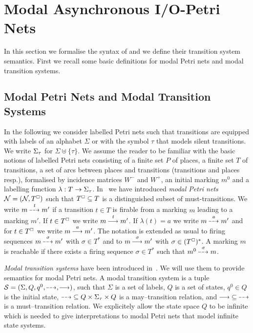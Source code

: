 
\section{Modal Asynchronous I/O-Petri Nets}\label{sec:maiots}

In this section we formalise the syntax of \MAIOPNs and we define their transition system semantics. 
First we recall some basic definitions for modal Petri nets and modal transition systems.

\subsection{Modal Petri Nets and Modal Transition Systems}\label{subsec:basics-modal}

In the following we consider labelled Petri nets such that transitions are equipped
with labels of an alphabet $\Sigma$ or with the symbol $\tau$ that models silent transitions.
We write $\Sigma_\tau$ for $\Sigma \uplus \{\tau\}$.
We assume the reader to be familiar with the basic notions of labelled Petri nets consisting of a finite set
$P$ of places, a finite set $T$ of transitions, a set of arcs between places and transitions (transitions and places resp.),
formalised by incidence matrices $W^-$ and $W^+$,
an initial marking $m^0$ and a labelling function $\lambda : T \rightarrow \Sigma_\tau$. 
In~\cite{EHH12} we have introduced \emph{modal Petri nets}
$\mathcal{N} = (\mathcal{N}_{},T_{}^{\scriptscriptstyle\square})$ such that $T^{\scriptscriptstyle\square} \subseteq T$  is a distinguished subset  of must-transitions.
We write $m \may{t} m'$ if a transition $t \in T$ is firable from a marking $m$ leading to a marking $m'$.
If $t \in T^{\scriptscriptstyle\square}$ we write $m \must{t} m'$. 
If $\lambda (t) = a$ we write $m \may{a} m'$ and for $t \in T^{\scriptscriptstyle\square}$ we write $m \must{a} m'$.
The notation is extended as usual to firing sequences $m \may{\sigma} m'$ with $\sigma \in  T^{*}$
and to $m \must{\sigma} m'$ with $\sigma \in  (T^{\scriptscriptstyle\square})^{*}$.
A marking $m$ is reachable if there exists a firing sequence $\sigma \in  T^{*}$ such that  $m^{0} \may{\sigma} m$.

\emph{Modal transition systems} have been introduced in~\cite{DBLP:conf/lics/LarsenT88}. We will use them
to provide semantics for modal Petri nets.
A modal transition system is a tuple $\S = (\Sigma, Q, q^0, \may{},\must{})$, such that
$\Sigma$ is a set of labels, $Q$ is a set of states, $q^0 \in Q$ is the initial state,
$\may{} \; \subseteq Q \times \Sigmat \times Q$ is a may--transition relation, and
$\must{} \; \subseteq \; \may{}$ is a must--transition relation.
We explicitely allow the state space $Q$ to be infinite which is needed to give interpretations
to modal Petri nets that model infinite state systems.

